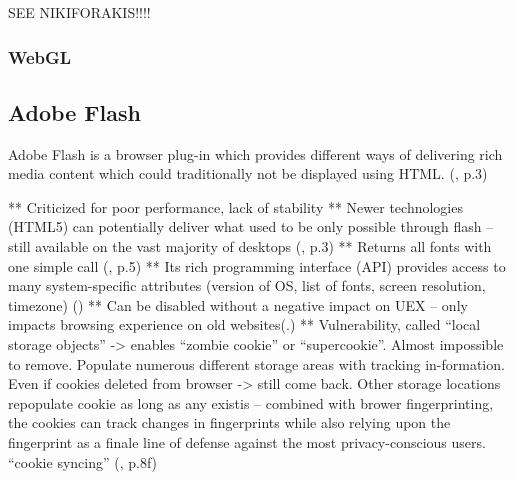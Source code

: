 SEE NIKIFORAKIS!!!!


\subsubsection{WebGL}\label{webgl}


\subsection{Adobe Flash}\label{adobe}
Adobe Flash is a browser plug-in which provides different ways of delivering rich media content which could traditionally not be displayed using HTML. (\textcite{nikiforakis13}, p.3)


**	Criticized for poor performance, lack of stability
**	Newer technologies (HTML5) can potentially deliver what used to be only possible through flash – still available on the vast majority of desktops (\textcite{nikiforakis13}, p.3)
**	Returns all fonts with one simple call (\textcite{havens16}, p.5)
**	Its rich programming interface (API) provides access to many system-specific attributes (version of OS, list of fonts, screen resolution, timezone) (\textcite{amiunique})
**	Can be disabled without a negative impact on UEX – only impacts browsing experience on old websites(\textcite{pixel18}.)
**	Vulnerability, called “local storage objects” -> enables “zombie cookie” or “supercookie”. Almost impossible to remove. Populate numerous different storage areas with tracking in-formation. Even if cookies deleted from browser -> still come back. Other storage locations repopulate cookie as long as any existis – combined with brower fingerprinting, the cookies can track changes in fingerprints while also relying upon the fingerprint as a finale line of defense against the most privacy-conscious users. “cookie syncing” (\textcite{havens16}, p.8f)

